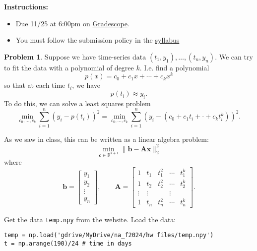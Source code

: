 \documentclass[12pt]{article}
\theoremstyle{definition}
\newtheorem{problem}{Problem}
\renewcommand{\vec}{\mathbf}
\begin{document}
\textbf{\Large{}}
    
    \vspace{-1.8em}
    \hrulefill

    \textbf{Instructions:}
    \begin{itemize}
        \item Due 11/25 at 6:00pm on \href{https://www.gradescope.com/courses/818054}{Gradescope}.
        \item You must follow the submission policy in the \href{https://courses.chen.pw/na_f2024/syllabus.html}{syllabus} 
\end{itemize}
   
\vspace{.5em}

\begin{problem}
    Suppose we have time-series data $(t_1, y_1), \ldots, (t_n,y_n)$. 
    We can try to fit the data with a polynomial of degree $k$. 
    I.e. find a polynomial 
    \[
    p(x) = c_0 + c_1 x + \cdots + c_k x^k
    \]
    so that at each time $t_i$, we have
    \[
    p(t_i) \approx y_i.
    \]
    To do this, we can solve a least squares problem
    \[
        \min_{c_0, \ldots, c_k} \sum_{i=1}^{n} ( y_i - p(t_i))^2
        =
        \min_{c_0, \ldots, c_k} \sum_{i=1}^{n} ( y_i - (c_0 + c_1 t_i + \cdot + c_k t_i^k))^2.
    \]

    As we saw in class, this can be written as a linear algebra problem:
    \[
    \min_{\vec{c}\in\mathbb{R}^{k+1}} \| \vec{b} - \vec{A}\vec{x} \|_2^2
    \]
    where
    \[
    \vec{b} = \begin{bmatrix} y_1 \\ y_2 \\ \vdots \\ y_n \end{bmatrix}
    ,\qquad
    \vec{A} = 
    \begin{bmatrix} 
        1 & t_1 & t_1^2 & \cdots & t_1^k \\
        1 & t_2 & t_2^2 & \cdots & t_2^k \\
        \vdots & \vdots &&\vdots \\
        1 & t_n & t_n^2 & \cdots & t_n^k 
    \end{bmatrix}.
    \]

    Get the data \texttt{temp.npy} from the website. 
    Load the data:    
    \begin{lstlisting}
temp = np.load('gdrive/MyDrive/na_f2024/hw files/temp.npy')
t = np.arange(190)/24 # time in days
    \end{lstlisting}


\end{problem}
\end{document}
